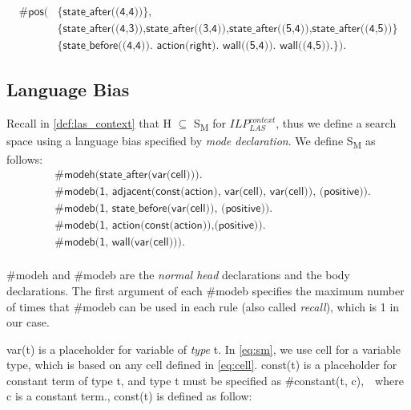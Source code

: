 \begin{examp}
\begin{equation}
\begin{split}
\textsf{\#pos(} & \textsf{\{state\_after((4,4))\}}, \\
                & \textsf{\{state\_after((4,3)),state\_after((3,4)),state\_after((5,4)),state\_after((4,5))\}} \\
                & \textsf{\{state\_before((4,4)). action(right). wall((5,4)). wall((4,5)).\}).}
\end{split}
\end{equation}

\end{examp}
\label{state_transition_example}

\subsection{Language Bias}
\label{subsec:language_bias}
Recall in \ref{def:las_context} that H $\subseteq$ S\textsubscript{M} for $ILP_{LAS}^{context}$, thus we define a search space using a language bias specified by \textit{mode declaration}.
We define S\textsubscript{M} as follows:
\begin{equation} \label{eq:sm}
\begin{split}
&\textsf{\#modeh(state\_after(var(cell))).}\\
&\textsf{\#modeb(1, adjacent(const(action), var(cell), var(cell)), (positive)).} \\
&\textsf{\#modeb(1, state\_before(var(cell)), (positive)).} \\
&\textsf{\#modeb(1, action(const(action)),(positive)).} \\
&\textsf{\#modeb(1, wall(var(cell))).} \\
\end{split}
\end{equation}

\textsf{\#modeh} and \textsf{\#modeb} are the \textit{normal head} declarations and the body declarations. 
The first argument of each \textsf{\#modeb} specifies the maximum number of times that \textsf{\#modeb} can be used in each rule (also called \textit{recall}), which is 1 in our case.  

\textsf{var(t)} is a placeholder for variable of \textit{type} \textsf{t}. In \ref{eq:sm}, we use \textsf{cell} for a variable type, which is based on any cell defined in \ref{eq:cell}.
\textsf{const(t)} is a placeholder for constant term of type \textsf{t}, and type \textsf{t} must be specified as \textsf{\#constant(t, c)},　where \textsf{c} is a constant term., 
const(t) is defined as follow:

